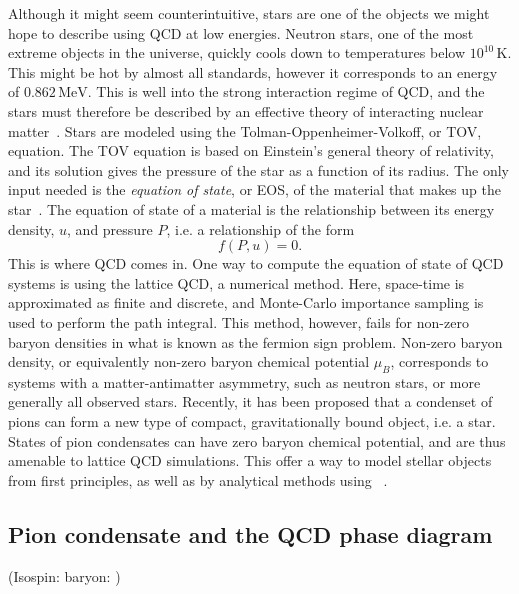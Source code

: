 Although it might seem counterintuitive, stars are one of the objects we might hope to describe using QCD at low energies.
Neutron stars, one of the most extreme objects in the universe, quickly cools down to temperatures below $10^{10} \, \text{K}$.
This might be hot by almost all standards, however it corresponds to an energy of $0.862 \, \text{MeV}$.
This is well into the strong interaction regime of QCD, and the stars must therefore be described by an effective theory of interacting nuclear matter~\cite{glendenning:compcat_stars,from_hadrons_to_quarks}.
Stars are modeled using the Tolman-Oppenheimer-Volkoff, or TOV, equation.
The TOV equation is based on Einstein's general theory of relativity, and its solution gives the pressure of the star as a function of its radius.
The only input needed is the \emph{equation of state}, or EOS, of the material that makes up the star~\cite{Carroll:spacetime}.
The equation of state of a material is the relationship between its energy density, $u$, and pressure $P$, i.e. a relationship of the form
\begin{equation}
    f(P, u) = 0.
\end{equation}
This is where QCD comes in.
One way to compute the equation of state of QCD systems is using the lattice QCD, a numerical method.
Here, space-time is approximated as finite and discrete, and Monte-Carlo importance sampling is used to perform the path integral.
This method, however, fails for non-zero baryon densities in what is known as the fermion sign problem.
Non-zero baryon density, or equivalently non-zero baryon chemical potential $\mu_B$, corresponds to systems with a matter-antimatter asymmetry, such as neutron stars, or more generally all observed stars.
Recently, it has been proposed that a condenset of pions can form a new type of compact, gravitationally bound object, i.e. a star.
States of pion condensates can have zero baryon chemical potential, and are thus amenable to lattice QCD simulations.
This offer a way to model stellar objects from first principles, as well as by analytical methods using \chpt~\cite{new_clas_of_compact_stars,andersen:bose_einstein}.

\subsection*{Pion condensate and the QCD phase diagram}
(Isospin: \cite{Brandt:QCD_phase_diagram_with_isospin_chemical_potential,PhysRevD.97.054514}
baryon: \cite{from_hadrons_to_quarks,Fukushima:The_phase_diagram_of_dense_QCD})

